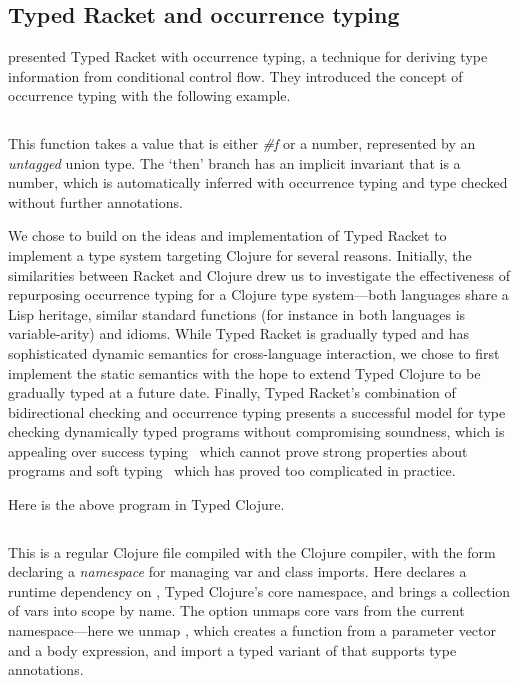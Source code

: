\subsection{Typed Racket and occurrence typing}

\citet{TF10}
presented Typed Racket with occurrence typing,
a technique for deriving type information from conditional control flow.
They introduced the concept of occurrence typing 
with the following example.

\inputminted[firstline=1]{racket}{code/tr/example1.rkt}

This function takes a value that is either \emph{\#f} %
or a number, represented by an \emph{untagged} union type.
The `then' branch has an implicit invariant
that  is a number, which is automatically inferred with occurrence typing
and type checked without further annotations.

We chose to build on the ideas and implementation
of Typed Racket to implement a type system targeting Clojure for several reasons.
Initially, the similarities between Racket and Clojure drew us to
investigate the effectiveness of repurposing occurrence typing
for a Clojure type system---both languages share a Lisp heritage,
similar standard functions 
(for instance 
in both languages is variable-arity)
and idioms.
While Typed Racket is gradually typed and has sophisticated
dynamic semantics for cross-language interaction, we 
chose to first implement
the static semantics
with the hope to extend Typed Clojure to be gradually typed at a future date.
Finally,
Typed Racket's combination of bidirectional checking
and occurrence typing presents a successful model for 
type checking dynamically typed programs without compromising
soundness, which is appealing over success typing~\cite{todo-dialyzer-paper}
which cannot prove strong properties about programs
and soft typing~\cite{successtyping-todo}
which has proved too complicated in practice.

Here is the above program in Typed Clojure.

\begin{exmp}
\inputminted[firstline=1]{clojure}{code/demo/src/demo/eg1.clj}
\label{example:conditionalflow}
\end{exmp}

This is a regular Clojure file compiled with
the Clojure compiler, with the  form
declaring a
\emph{namespace}
for managing var and class imports.
Here  declares a runtime dependency 
on
,
Typed Clojure's core namespace, and
brings a collection of vars into scope by name.
The   option unmaps core vars from the current 
namespace---here we unmap ,
which creates a function from a parameter vector and a body expression,
and import a typed variant of 
that supports type annotations.

